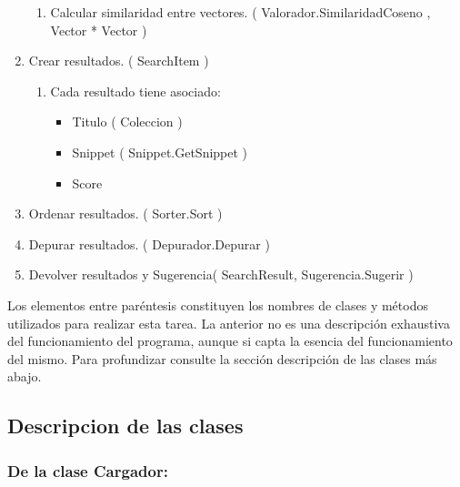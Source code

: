 \documentclass{article}
\begin{document}
\begin{enumerate}
\begin{enumerate}
      \item Calcular similaridad entre vectores. ( Valorador.SimilaridadCoseno , Vector * Vector )
    \end{enumerate}
  \item Crear resultados. ( SearchItem )
    \begin{enumerate}
      \item Cada resultado tiene asociado:
        \begin{itemize}
          \item Titulo ( Coleccion )
          \item Snippet ( Snippet.GetSnippet )
          \item Score
        \end{itemize}
    \end{enumerate}
  \item Ordenar resultados. ( Sorter.Sort )
  \item Depurar resultados. ( Depurador.Depurar )
  \item Devolver resultados  y Sugerencia( SearchResult, Sugerencia.Sugerir )
\end{enumerate}

Los elementos entre paréntesis constituyen los nombres de clases y métodos utilizados para realizar esta tarea. La anterior no es una descripción exhaustiva del funcionamiento del programa, aunque si capta la esencia del funcionamiento del mismo. Para profundizar  consulte la sección descripción de las clases más abajo.

\subsection{Descripcion de las clases}
\subsubsection{De la clase Cargador:}
\end{document}
